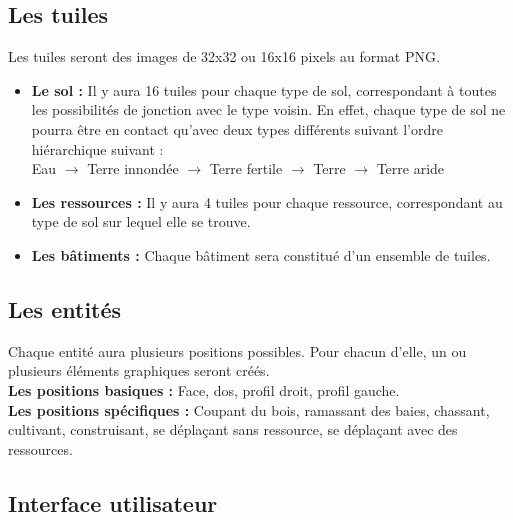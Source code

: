 \documentclass[a4paper]{article}
\newcommand{\alinea}{\hspace*{0.5cm}}
\begin{document}
      \subsection{Les tuiles}
        \label{Tuile}
        \alinea Les tuiles seront des images de 32x32 ou 16x16 pixels au format PNG.\\
        \begin{itemize} \small
          \item \textbf{Le sol :} Il y aura 16 tuiles pour chaque type de sol, correspondant à toutes les possibilités de jonction avec le type voisin. En effet, chaque type de sol ne pourra être en contact qu'avec deux types différents suivant l'ordre hiérarchique suivant :\\
          Eau $\rightarrow$ Terre innondée $\rightarrow$ Terre fertile $\rightarrow$ Terre $\rightarrow$ Terre aride
          \item \textbf{Les ressources :} Il y aura 4 tuiles pour chaque ressource, correspondant au type de sol sur lequel elle se trouve.
          \item \textbf{Les bâtiments :} Chaque bâtiment sera constitué d'un ensemble de tuiles.
        \end{itemize} \normalsize
  
      \subsection{Les entités}
        \alinea Chaque entité aura plusieurs positions possibles. Pour chacun d'elle, un ou plusieurs éléments graphiques seront créés.\\
        \textbf{Les positions basiques :} Face, dos, profil droit, profil gauche.\\
        \textbf{Les positions spécifiques :} Coupant du bois, ramassant des baies, chassant, cultivant, construisant, se déplaçant sans ressource, se déplaçant avec des ressources.
	
      \subsection{Interface utilisateur}
		
    
\end{document}
